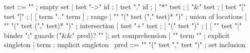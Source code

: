 \begin{syntax}
  tset ::= "\empty" ; empty set
       | tset "->" id ;
       | tset "." id ;
       | "*" tset ;
       | "&" tset ;
       | tset "[" tset "]" ;
       | [ term ".." term ] ; range
       | "\union" "(" tset ("," tset)* ")" ; union of locations
       | "\inter" "(" tset ("," tset)* ")" ; intersection
       | tset "+" tset ;
       | "(" tset ")" ;
       | [ "{" tset "|" binder ";" guards ("&&" pred)? "}" ]; set comprehension
       | { "{" term "}" } ; explicit singleton
       | term ; implicit singleton
       \
  pred ::= {"\subset" "(" tset "," tset ")"} ; set inclusion
\end{syntax}
